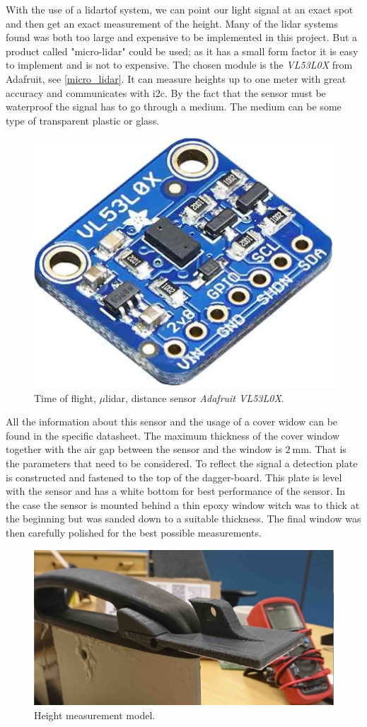 With the use of a \gls{lidar}\gls{tof} system, we can point our light signal at an exact spot and then get an exact measurement of the height.  
Many of the \gls{lidar} systems found was both too large and expensive to be implemented in this project.
But a product called "micro-lidar" could be used; as it has a small form factor it is easy to implement and is not to expensive.
The chosen module is the \emph{VL53L0X} from Adafruit\cite{micro_lidar}, see \autoref{micro_lidar}. It can measure heights up to one meter with great accuracy and communicates with \gls{i2c}.
By the fact that the sensor must be waterproof the signal has to go through a medium. The medium can be some type of transparent plastic or glass.
\begin{figure}[H]
	\centering
	\includegraphics[width = .45\textwidth]{Figures/Adafruit_height_sensor.jpg}
	\caption{Time of flight, $\mu$\gls{lidar}, distance sensor \emph{Adafruit VL53L0X}.}
	\label{micro_lidar}
\end{figure}

All the information about this sensor and the usage of a cover widow can be found in the specific datasheet\cite{Tof_cover}. The maximum thickness of the cover window together with the air gap between the sensor and the window is $2~\textrm{mm}$. That is the parameters that need to be considered. To reflect the signal a detection plate is constructed and fastened to the top of the dagger-board. This plate is level with the sensor and has a white bottom for best performance of the sensor. In the case the sensor is mounted behind a thin epoxy window witch was to thick at the beginning but was sanded down to a suitable thickness. The final window was then carefully polished for the best possible measurements. 

\begin{figure}[H]
	\centering
	\includegraphics[width = .8\textwidth]{Figures/height_measure.jpg}
	\caption{Height measurement model.}
	\label{height_measure}
\end{figure}


